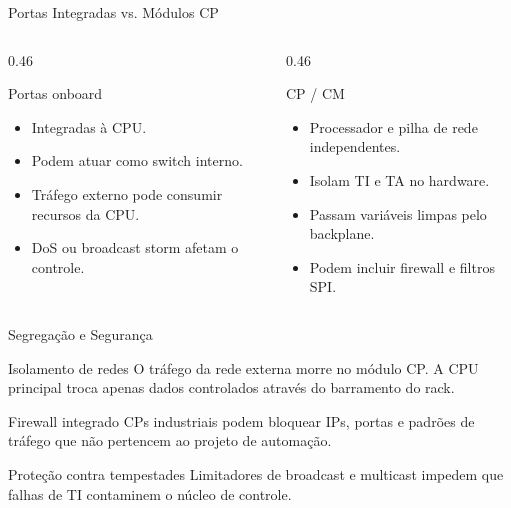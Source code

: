 \documentclass[10pt, aspectratio=169]{beamer}
\begin{document}
\begin{frame}{Portas Integradas vs. M\'odulos CP}
    \small
    \begin{columns}[T,totalwidth=\textwidth]
        \begin{column}{0.46\textwidth}
            \begin{block}{Portas onboard}
                \begin{itemize}
                    \item Integradas \`a CPU.
                    \item Podem atuar como switch interno.
                    \item Tr\'afego externo pode consumir recursos da CPU.
                    \item DoS ou broadcast storm afetam o controle.
                \end{itemize}
            \end{block}
        \end{column}
        \begin{column}{0.46\textwidth}
            \begin{block}{CP / CM}
                \begin{itemize}
                    \item Processador e pilha de rede independentes.
                    \item Isolam TI e TA no hardware.
                    \item Passam vari\'aveis limpas pelo backplane.
                    \item Podem incluir firewall e filtros SPI.
                \end{itemize}
            \end{block}
        \end{column}
    \end{columns}
\end{frame}

\begin{frame}{Segrega\c{c}\~ao e Seguran\c{c}a}
    \small
    \begin{block}{Isolamento de redes}
        O tr\'afego da rede externa morre no m\'odulo CP. A CPU principal troca apenas dados controlados atrav\'es do barramento do rack.
    \end{block}

    \begin{block}{Firewall integrado}
        CPs industriais podem bloquear IPs, portas e padr\~oes de tr\'afego que n\~ao pertencem ao projeto de automa\c{c}\~ao.
    \end{block}

    \begin{block}{Prote\c{c}\~ao contra tempestades}
        Limitadores de broadcast e multicast impedem que falhas de TI contaminem o n\'ucleo de controle.
    \end{block}
\end{frame}
\end{document}
